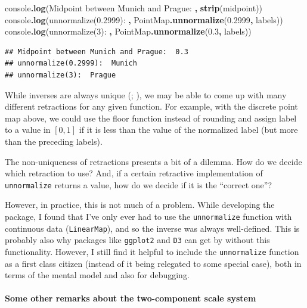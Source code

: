 \documentclass[
]{book}
\newenvironment{Shaded}{\begin{snugshade}}{\end{snugshade}}
\newcommand{\BuiltInTok}[1]{#1}
\newcommand{\FloatTok}[1]{\textcolor[rgb]{0.00,0.00,0.81}{#1}}
\newcommand{\FunctionTok}[1]{\textcolor[rgb]{0.13,0.29,0.53}{\textbf{#1}}}
\newcommand{\NormalTok}[1]{#1}
\newcommand{\OperatorTok}[1]{\textcolor[rgb]{0.81,0.36,0.00}{\textbf{#1}}}
\newcommand{\VerbatimStringTok}[1]{\textcolor[rgb]{0.31,0.60,0.02}{#1}}
\theoremstyle{definition}
\theoremstyle{definition}
\theoremstyle{definition}
\theoremstyle{definition}
\theoremstyle{remark}
\begin{document}
\begin{Shaded}
\begin{Highlighting}[]
\BuiltInTok{console}\OperatorTok{.}\FunctionTok{log}\NormalTok{(}\VerbatimStringTok{\textasciigrave{}Midpoint between Munich and Prague: \textasciigrave{}}\OperatorTok{,} \FunctionTok{strip}\NormalTok{(midpoint))}
\BuiltInTok{console}\OperatorTok{.}\FunctionTok{log}\NormalTok{(}\VerbatimStringTok{\textasciigrave{}unnormalize(0.2999): \textasciigrave{}}\OperatorTok{,}\NormalTok{ PointMap}\OperatorTok{.}\FunctionTok{unnormalize}\NormalTok{(}\FloatTok{0.2999}\OperatorTok{,}\NormalTok{ labels))}
\BuiltInTok{console}\OperatorTok{.}\FunctionTok{log}\NormalTok{(}\VerbatimStringTok{\textasciigrave{}unnormalize(3): \textasciigrave{}}\OperatorTok{,}\NormalTok{ PointMap}\OperatorTok{.}\FunctionTok{unnormalize}\NormalTok{(}\FloatTok{0.3}\OperatorTok{,}\NormalTok{ labels))}
\end{Highlighting}
\end{Shaded}

\begin{verbatim}
## Midpoint between Munich and Prague:  0.3
## unnormalize(0.2999):  Munich
## unnormalize(3):  Prague
\end{verbatim}

While inverses are always unique (; ), we may be able to come up with many different retractions for any given function. For example, with the discrete point map above, we could use the floor function instead of rounding and assign label to a value in \([0, 1]\) if it is less than the value of the normalized label (but more than the preceding labels).

The non-uniqueness of retractions presents a bit of a dilemma. How do we decide which retraction to use? And, if a certain retractive implementation of \texttt{unnormalize} returns a value, how do we decide if it is the ``correct one''?

However, in practice, this is not much of a problem. While developing the package, I found that I've only ever had to use the \texttt{unnormalize} function with continuous data (\texttt{LinearMap}), and so the inverse was always well-defined. This is probably also why packages like \texttt{ggplot2} and \texttt{D3} can get by without this functionality. However, I still find it helpful to include the \texttt{unnormalize} function as a first class citizen (instead of it being relegated to some special case), both in terms of the mental model and also for debugging.

\paragraph{Some other remarks about the two-component scale system}\label{some-other-remarks-about-the-two-component-scale-system}
\end{document}
